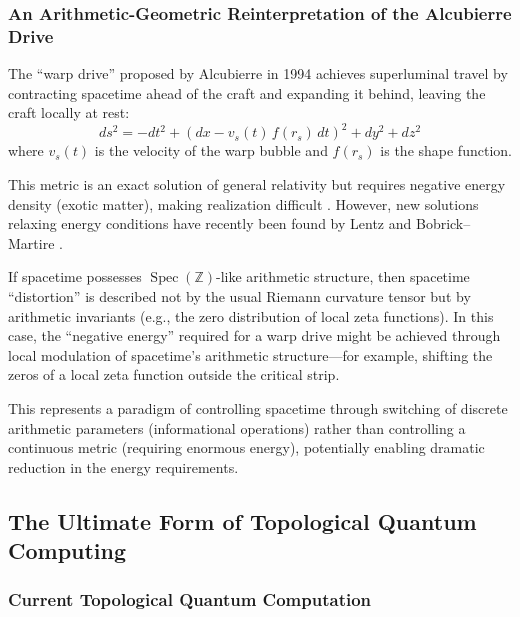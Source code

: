 \documentclass[12pt,a4paper]{article}
\theoremstyle{definition}
\newcommand{\Spec}{\operatorname{Spec}}
\begin{document}
\subsubsection{An Arithmetic-Geometric Reinterpretation of the Alcubierre Drive}

The ``warp drive'' proposed by Alcubierre in 1994 \cite{Alcubierre1994} achieves superluminal travel by contracting spacetime ahead of the craft and expanding it behind, leaving the craft locally at rest:
\begin{equation}
  ds^2 = -dt^2 + (dx - v_s(t)\, f(r_s)\, dt)^2 + dy^2 + dz^2
\end{equation}
where $v_s(t)$ is the velocity of the warp bubble and $f(r_s)$ is the shape function.

This metric is an exact solution of general relativity but requires negative energy density (exotic matter), making realization difficult \cite{Pfenning1997}. However, new solutions relaxing energy conditions have recently been found by Lentz \cite{Lentz2021} and Bobrick--Martire \cite{BobrickMartire2021}.

\begin{techbox}
If spacetime possesses $\Spec(\mathbb{Z})$-like arithmetic structure, then spacetime ``distortion'' is described not by the usual Riemann curvature tensor but by arithmetic invariants (e.g., the zero distribution of local zeta functions). In this case, the ``negative energy'' required for a warp drive might be achieved through local modulation of spacetime's arithmetic structure---for example, shifting the zeros of a local zeta function outside the critical strip.

This represents a paradigm of controlling spacetime through switching of discrete arithmetic parameters (informational operations) rather than controlling a continuous metric (requiring enormous energy), potentially enabling dramatic reduction in the energy requirements.
\end{techbox}

\subsection{The Ultimate Form of Topological Quantum Computing}

\subsubsection{Current Topological Quantum Computation}
\end{document}
